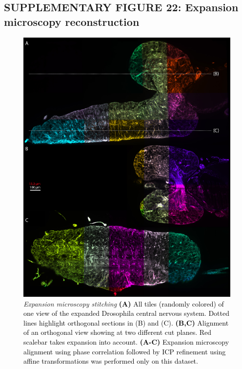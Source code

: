 \documentclass[]{spie}  %
\def\red{\textcolor{black}}
\begin{document}
\subsection*{SUPPLEMENTARY FIGURE 22: Expansion microscopy reconstruction}
\vspace{-2mm}
\begin{figure}[h!]
\center\includegraphics[width=\textwidth-1.9cm]{fig-expansion_tiling.jpg}
\vspace{2.0mm}
\caption{\hspace{-0.5mm} \emph{Expansion microscopy stitching} \red{\textbf{(A)} All tiles (randomly colored) of one view of the expanded Drosophila central nervous system. Dotted lines highlight orthogonal sections in (B) and (C). \textbf{(B,C)} Alignment of an orthogonal view showing at two different cut planes. Red scalebar takes expansion into account. \textbf{(A-C)} Expansion microscopy alignment using phase correlation followed by ICP refinement using affine transformations was performed only on this dataset.}
}
\label{fig:sup-fig-expansion-microscopy}
\end{figure}
\end{document}
